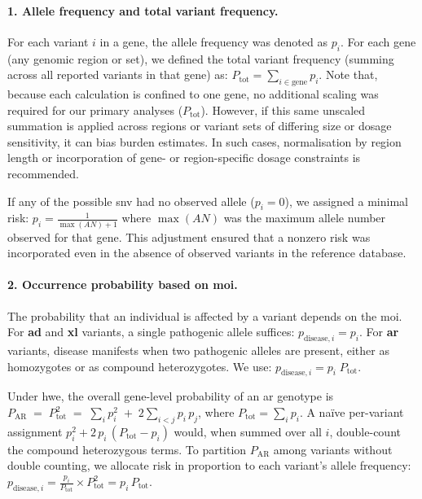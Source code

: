 \paragraph{1. Allele frequency and total variant frequency.} 
\label{sec:min_risk}
For each variant \(i\) in a gene, the allele frequency was denoted as \(p_i\). For each gene (any genomic region or set), we defined the total variant frequency (summing across all reported variants in that gene) as:
$P_{\text{tot}} = \sum_{i \in \text{gene}} p_i$.
Note that, because each calculation is confined to one gene, no additional scaling was required for our primary analyses (\(P_{\text{tot}}\)). However, if this same unscaled summation is applied across regions or variant sets of differing size or dosage sensitivity, it can bias burden estimates. In such cases, normalisation by region length or incorporation of gene- or region-specific dosage constraints is recommended.

If any of the possible \ac{snv}  had no observed allele (\(p_i = 0\)), we assigned a minimal risk:
$p_i = \frac{1}{\max(AN) + 1}$
where \(\max(AN)\) was the maximum allele number observed for that gene. This adjustment ensured that a nonzero risk was incorporated even in the absence of observed variants in the reference database.

\paragraph{2. Occurrence probability based on \ac{moi}.}
The probability that an individual is affected by a variant depends on the \ac{moi}. For \textbf{\ac{ad}} and \textbf{\ac{xl}} variants, a single pathogenic allele suffices:
$p_{\text{disease},i} = p_i$.
For\textbf{ \ac{ar}} variants, disease manifests when two pathogenic alleles are present, either as homozygotes or as compound heterozygotes. We use:
$p_{\text{disease},i} = p_i \; P_{\text{tot}}$. %

Under \ac{hwe}, the overall gene-level probability of an \ac{ar} genotype is
$P_{\text{AR}} \;=\; P_{\text{tot}}^2
\;=\;\sum_i p_i^2 \;+\; 2\sum_{i<j} p_i\,p_j$,
where \(P_{\text{tot}}=\sum_i p_i\). A naïve per-variant assignment
$p_i^2 + 2\,p_i\,(P_{\text{tot}} - p_i)$
would, when summed over all \(i\), double-count the compound heterozygous terms. 
To partition \(P_{\text{AR}}\) among variants without double counting, we allocate risk in proportion to each variant’s allele frequency:
$
p_{\text{disease},i}
=\frac{p_i}{P_{\text{tot}}}\times P_{\text{tot}}^2
= p_i\,P_{\text{tot}}$.

